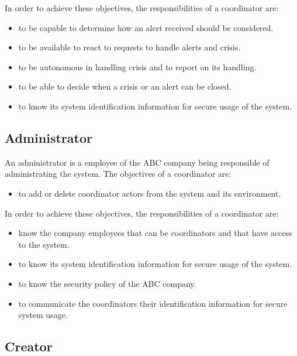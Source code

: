 In order to achieve these objectives, the responsibilities of a coordinator are:
\begin{itemize}
  \item to be capable to determine how an alert received should be considered.
  \item to be available to react to requests to handle alerts and crisis.
  \item to be autonomous in handling crisis and to report on its handling.
  \item to be able to decide when a crisis or an alert can be closed.
  \item to know its system identification information for secure usage of the system.
\end{itemize}

\subsection{Administrator}
An administrator is a employee of the ABC company being responsible of administrating the \msricrash system. The objectives of a coordinator are:
\begin{itemize}
  \item to add or delete coordinator actors from the system and its environment.
\end{itemize}
\vspace{0.5cm}

In order to achieve these objectives, the responsibilities of a coordinator are:
\begin{itemize}
  \item know the company employees that can be coordinators and that have access to the system.
  \item to know its system identification information for secure usage of the system.
  \item to know the security policy of the ABC company.
  \item to communicate the coordinators their identification information for secure system usage.
\end{itemize}


\subsection{Creator}

